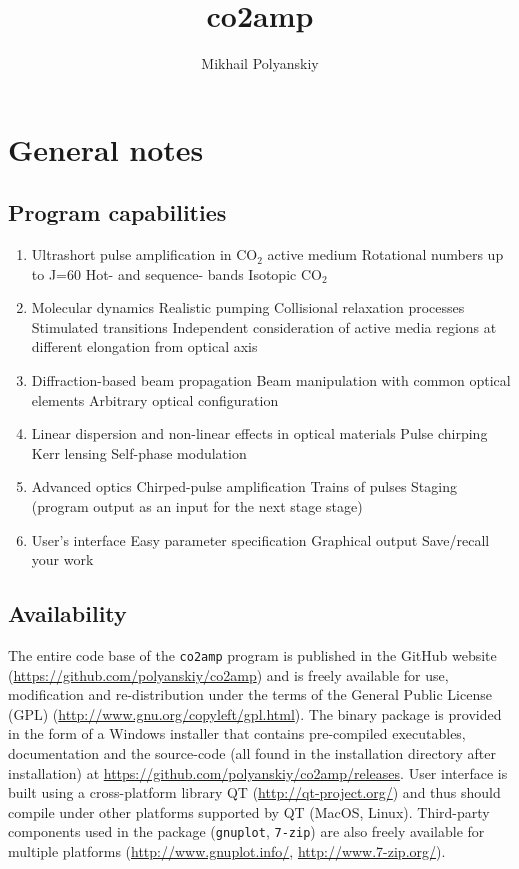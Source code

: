 \documentclass{report}
\begin{document}
\title{co2amp}
\author{Mikhail Polyanskiy}
\maketitle

\tableofcontents

\chapter{General notes}

\section{Program capabilities}
\begin{enumerate}
\item Ultrashort pulse amplification in CO$_2$ active medium
\subitem Rotational numbers up to J=60
\subitem Hot- and sequence- bands
\subitem Isotopic CO$_2$
\item Molecular dynamics
\subitem Realistic pumping
\subitem Collisional relaxation processes
\subitem Stimulated transitions
\subitem Independent consideration of active media regions at different elongation from optical axis
\item Diffraction-based beam propagation
\subitem Beam manipulation with common optical elements
\subitem Arbitrary optical configuration
\item Linear dispersion and non-linear effects in optical materials
\subitem Pulse chirping
\subitem Kerr lensing
\subitem Self-phase modulation
\item Advanced optics
\subitem Chirped-pulse amplification
\subitem Trains of pulses
\subitem Staging (program output as an input for the next stage stage)
\item User's interface
\subitem Easy parameter specification
\subitem Graphical output
\subitem Save/recall your work
\end{enumerate}

\section{Availability}
The entire code base of the \texttt{co2amp} program is published in the GitHub website (\url{https://github.com/polyanskiy/co2amp}) and is freely available for use, modification and re-distribution under the terms of the General Public License (GPL) (\url{http://www.gnu.org/copyleft/gpl.html}). The binary package is provided in the form of a Windows installer that contains pre-compiled executables, documentation and the source-code (all found in the installation directory after installation) at \url{https://github.com/polyanskiy/co2amp/releases}. User interface is built using a cross-platform library QT (\url{http://qt-project.org/}) and thus should compile under other platforms supported by QT (MacOS, Linux). Third-party components used in the package (\texttt{gnuplot}, \texttt{7-zip}) are also freely available for multiple platforms (\url{http://www.gnuplot.info/}, \url{http://www.7-zip.org/}).
\end{document}
